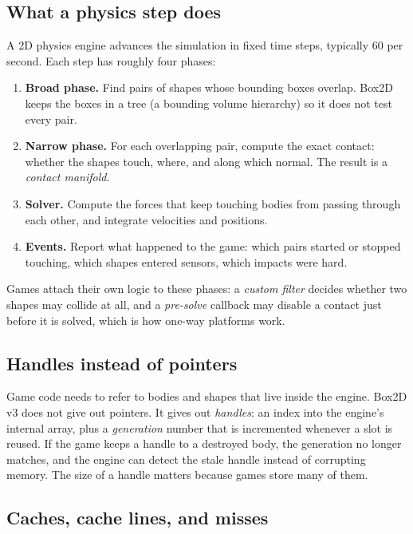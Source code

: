 \documentclass[11pt]{article}
\begin{document}
\subsection{What a physics step does}

A 2D physics engine advances the simulation in fixed time steps, typically 60 per second. Each
step has roughly four phases:

\begin{enumerate}[leftmargin=*,itemsep=2pt]
  \item \textbf{Broad phase.} Find pairs of shapes whose bounding boxes overlap. Box2D keeps the
        boxes in a tree (a bounding volume hierarchy) so it does not test every pair.
  \item \textbf{Narrow phase.} For each overlapping pair, compute the exact contact: whether the
        shapes touch, where, and along which normal. The result is a \emph{contact manifold}.
  \item \textbf{Solver.} Compute the forces that keep touching bodies from passing through each
        other, and integrate velocities and positions.
  \item \textbf{Events.} Report what happened to the game: which pairs started or stopped touching,
        which shapes entered sensors, which impacts were hard.
\end{enumerate}

Games attach their own logic to these phases: a \emph{custom filter} decides whether two shapes may
collide at all, and a \emph{pre-solve} callback may disable a contact just before it is solved,
which is how one-way platforms work.

\subsection{Handles instead of pointers}

Game code needs to refer to bodies and shapes that live inside the engine. Box2D v3 does not give
out pointers. It gives out \emph{handles}: an index into the engine's internal array, plus a
\emph{generation} number that is incremented whenever a slot is reused. If the game keeps a handle
to a destroyed body, the generation no longer matches, and the engine can detect the stale handle
instead of corrupting memory. The size of a handle matters because games store many of them.

\subsection{Caches, cache lines, and misses}
\end{document}
